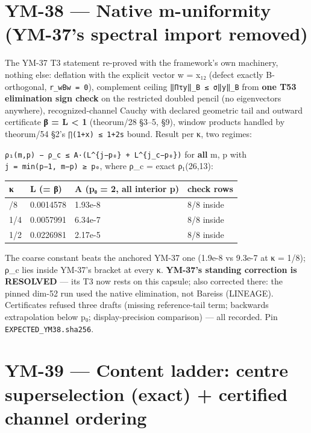 \hypertarget{ym-38-native-m-uniformity-ym-37s-spectral-import-removed}{%
\section{YM-38 --- Native m-uniformity (YM-37's spectral import removed)}\label{ym-38-native-m-uniformity-ym-37s-spectral-import-removed}}

The YM-37 T3 statement re-proved with the framework's own machinery, nothing else: deflation with the explicit vector w = x₁₂ (defect exactly B-orthogonal, \texttt{r\_w\textquotesingle{}Bw\ =\ 0}), complement ceiling \texttt{‖Πτy‖\_B\ ≤\ σ\textquotesingle{}\textquotesingle{}‖y‖\_B} from \textbf{one T53 elimination sign check} on the restricted doubled pencil (no eigenvectors anywhere), recognized-channel Cauchy with declared geometric tail and outward certificate \textbf{β = L \textless{} 1} (theorum/28 §3--5, §9), window products handled by theorum/54 §2's \texttt{∏(1+x)\ ≤\ 1+2s} bound. Result per κ, two regimes:

\texttt{\textbar{}ρ₁(m,p)\ −\ ρ\_c\textbar{}\ ≤\ A·(L\^{}\{j−p₀\}\ +\ L\^{}\{j\_c−p₀\})} for \textbf{all} m, p with \texttt{j\ =\ min(p−1,\ m−p)\ ≥\ p₀}, where ρ\_c = exact ρ₁(26,13):

\begin{longtable}[]{@{}llll@{}}
\toprule\noalign{}
κ & L (= β) & A (p₀ = 2, all interior p) & check rows \\
\midrule\noalign{}
\endhead
\bottomrule\noalign{}
\endlastfoot
1/8 & 0.0014578 & 1.93e-8 & 8/8 inside \\
1/4 & 0.0057991 & 6.34e-7 & 8/8 inside \\
1/2 & 0.0226981 & 2.17e-5 & 8/8 inside \\
\end{longtable}

The coarse constant beats the anchored YM-37 one (1.9e-8 vs 9.3e-7 at κ = 1/8); ρ\_c lies inside YM-37's bracket at every κ. \textbf{YM-37's standing correction is RESOLVED} --- its T3 now rests on this capsule; also corrected there: the pinned dim-52 run used the native elimination, not Bareiss (LINEAGE). Certificates refused three drafts (missing reference-tail term; backwards extrapolation below p₀; display-precision comparison) --- all recorded. Pin \texttt{EXPECTED\_YM38.sha256}.

\hypertarget{ym-39-content-ladder-centre-superselection-exact-certified-channel-ordering}{%
\section{YM-39 --- Content ladder: centre superselection (exact) + certified channel ordering}\label{ym-39-content-ladder-centre-superselection-exact-certified-channel-ordering}}

